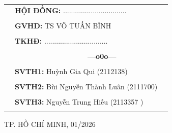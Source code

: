 \documentclass[a4paper]{article}
\theoremstyle{definition}
\begin{document}
\begin{titlepage}
\begin{center}
\begin{tabular}{lll}
\hspace{6 cm} &  \textbf{\Large HỘI ĐỒNG:} {\Large ................................}
\\
\\
\hspace{6 cm} &   \textbf{\Large GVHD:} {\Large TS VÕ TUẤN BÌNH}
\\
\\
\hspace{6 cm}  &   \textbf{\Large TKHĐ:} {\Large ................................}
\\
\\
\hspace{6 cm} &     \textbf{$\;$ $\;$$\;$$\;$$\;$$\;$$\;$$\;$$\;$$\;$$\;$$\;$$\;$$\;$$\;$$\;$$\;$$\;$$\;$$\;$$\;$$\;$$\;$$\;$$\;$$\;$$\;$$\;$$\;$$\;$$\;$$\;$$\;$$\;$ \Large ---o0o---} 
\\
\\
\hspace{6 cm} &   \textbf{\Large SVTH1:} {\Large Huỳnh Gia Qui (2112138)}
\\
\\
\hspace{6 cm}&   \textbf{\Large SVTH2:}  {\Large Bùi Nguyễn Thành Luân (2111700)}
\\
\\
\hspace{6 cm} &   \textbf{\Large SVTH3:}  {\Large Nguyễn Trung Hiếu (2113357 )}
\\
\\
\end{tabular}

\end{center}
\vspace{0.5cm}
\begin{center}
{\Large TP. HỒ CHÍ MINH, 01/2026 }
\end{center}
\end{titlepage}
\newpage

% 
% 
\newpage
\tableofcontents
\newpage
\listoffigures
\newpage
\listoftables
\newpage
\setcounter{page}{1}


\newpage

\newpage

\newpage

\newpage

\newpage

\newpage


\newpage


% 
\end{document}
